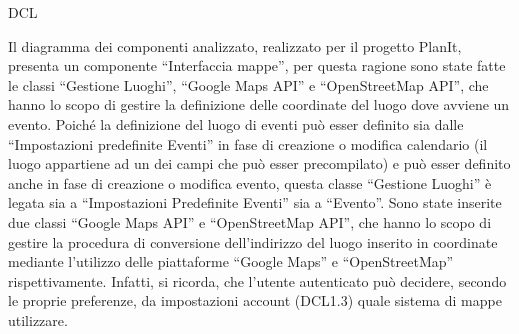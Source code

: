 \begin{listaPersonale}{DCL}
\begin{listaPersonale2}[DCL]{}
            


        Il diagramma dei componenti analizzato, realizzato per il progetto PlanIt, presenta un componente “Interfaccia mappe”, per questa ragione sono state fatte le classi “Gestione Luoghi”, “Google Maps API” e “OpenStreetMap API”, che hanno lo scopo di gestire la definizione delle coordinate del luogo dove avviene un evento. Poiché la definizione del luogo di eventi può esser definito sia dalle “Impostazioni predefinite Eventi” in fase di creazione o modifica calendario (il luogo appartiene ad un dei campi che può esser precompilato) e può esser definito anche in fase di creazione o modifica evento, questa classe “Gestione Luoghi” è legata sia a “Impostazioni Predefinite Eventi” sia a “Evento”.
        Sono state inserite due classi “Google Maps API” e “OpenStreetMap API”, che hanno lo scopo di gestire la procedura di conversione dell'indirizzo del luogo inserito in coordinate mediante l'utilizzo delle piattaforme “Google Maps” e “OpenStreetMap” rispettivamente. Infatti, si ricorda, che l'utente autenticato può decidere, secondo le proprie preferenze, da impostazioni account (DCL1.3) quale sistema di mappe utilizzare.
        
        
            \begin{center}
                
            \end{center}
        
            



\end{listaPersonale2}
\end{listaPersonale}
